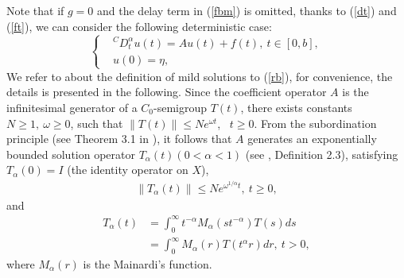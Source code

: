 \documentclass[12pt,a4paper,oneside,reqno,notitlepage]{amsart}
\theoremstyle{plain}
\numberwithin{equation}{section}
\begin{document}
Note that if $g=0$ and the delay term in (\ref{fbm}) is omitted, thanks to (\ref{dt}) and (\ref{ft}), we can consider the following deterministic case:
\begin{equation}\label{rb}
\left \{\begin{aligned}
&^{C}D_{t}^{\alpha}u(t)=Au(t)+f(t),\ t\in [0,b],\\
& u(0)=\eta,
\end{aligned}\right.
\end{equation}
We refer to \cite{kexue} about the definition of mild solutions to (\ref{rb}), for convenience, the details is presented in the following.
Since the coefficient operator $A$ is the infinitesimal generator of a $C_{0}$-semigroup $T(t)$, there exists constants $N\geq 1,\ \omega\geq 0$, such that $\|T(t)\|\leq Ne^{\omega t}$,  \ $t\geq 0$.
From the subordination principle (see Theorem 3.1 in \cite{Bazhlekova}), it follows that
$A$ generates an exponentially bounded solution operator $T_{\alpha}(t)(0<\alpha<1)$ (see \cite{Bazhlekova}, Definition 2.3), satisfying $T_{\alpha}(0)=I$ (the identity operator on $X$),
\begin{align}\label{exp}
\|T_{\alpha}(t)\|\leq Ne^{\omega^{1/\alpha}t}, \ t\geq0,
\end{align}
and
\begin{align}\label{rep1}
T_{\alpha}(t)&=\int_{0}^{\infty}t^{-\alpha}M_{\alpha}(st^{-\alpha})T(s)ds\nonumber\\
&=\int_{0}^{\infty}M_{\alpha}(r)T(t^{\alpha}r)dr,\ t>0,
\end{align}
where $M_{\alpha}(r)$ is the Mainardi's function.
\end{document}
